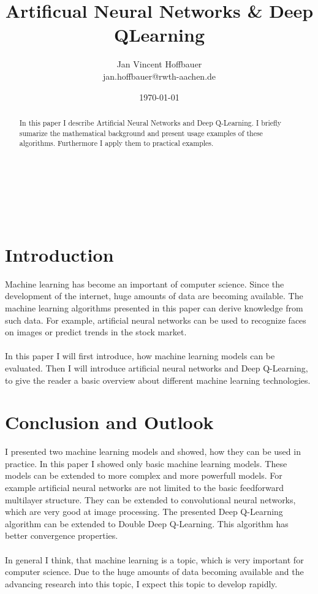 \documentclass[a4paper,12]{article}
\title{Artificual Neural Networks \& Deep QLearning}
\author{Jan Vincent Hoffbauer\\
jan.hoffbauer@rwth-aachen.de }
\date{\today}
\begin{document}
\maketitle
~\\
\\
\\

\begin{abstract}
In this paper I describe Artificial Neural Networks and Deep Q-Learning. I briefly sumarize the mathematical background and present usage examples of these algorithms. Furthermore I apply them to practical examples. 
\end{abstract}
  
\newpage
\tableofcontents
\newpage

\nocite{*}

\section{Introduction}
Machine learning has become an important of computer science. Since the development of the internet, huge amounts of data are becoming available. The machine learning algorithms presented in this paper can derive knowledge from such data. For example, artificial neural networks can be used to recognize faces on images or predict trends in the stock market. 
\\
\\
In this paper I will first introduce, how machine learning models can be evaluated. Then I will introduce artificial neural networks and Deep Q-Learning, to give the reader a basic overview about different machine learning technologies. 







\section{Conclusion and Outlook}
I presented two machine learning models and showed, how they can be used in practice. In this paper I showed only basic machine learning models. These models can be extended to more complex and more powerfull models. For example artificial neural networks are not limited to the basic feedforward multilayer structure. They can be extended to convolutional neural networks, which are very good at image processing. The presented Deep Q-Learning algorithm can be extended to Double Deep Q-Learning. This algorithm has better convergence properties. 
\\
\\
In general I think, that machine learning is a topic, which is very important for computer science. Due to the huge amounts of data becoming available and the advancing research into this topic, I expect this topic to develop rapidly.


\newpage
 

\end{document}
